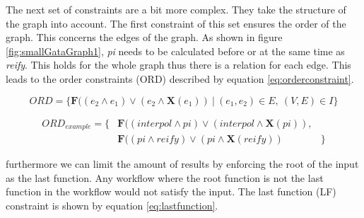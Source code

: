 \documentclass{article}
\begin{document}










 
The next set of constraints are a bit more complex. They take the structure of the graph into account. The first constraint of this set ensures the order of the graph. This concerns the edges of the graph. As shown in figure \ref{fig:smallGataGraph1}, \textit{pi} needs to be calculated before or at the same time as \textit{reify}. This holds for the whole graph thus there is a relation for each edge. This leads to the order constraints (ORD) described by equation \ref{eq:orderconstraint}.

\begin{equation}
    ORD = \{\textbf{F}((e_2 \wedge e_1) \vee (e_2 \wedge \textbf{X} (e_1)  )\  |\  (e_1,e_2) \in  E ,\ (V,E) \in  I  \} \label{eq:orderconstraint}
\end{equation}

\begin{align*}
    ORD_{example} = \{ & \textbf{F}((interpol \wedge pi) \vee (interpol \wedge \textbf{X} (pi)  ), \\
    &\textbf{F}((pi \wedge reify) \vee (pi \wedge \textbf{X} (reify)  ) &
    \}  
\end{align*}

furthermore we can limit the amount of results by enforcing the root of the input as the last function. Any workflow where the root function is not the last function in the workflow would not satisfy the input. The last function (LF) constraint is shown by equation \ref{eq:lastfunction}. 

\end{document}
